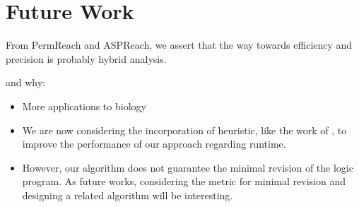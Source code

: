 \section{Future Work}

From PermReach and ASPReach, we assert that the way towards efficiency and precision is probably hybrid analysis.

and why:
\begin{itemize}
    \item More applications to biology
    \item We are now considering the incorporation of heuristic, like the work of \cite{PRNs-TCS18}, to improve the performance of our approach regarding runtime.
    \item However, our algorithm does not guarantee the minimal revision of the logic program.
As future works, considering the metric for minimal revision and designing a related algorithm will be interesting.
\end{itemize}